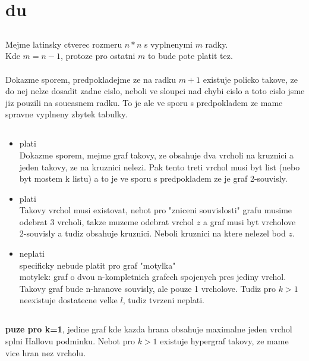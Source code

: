 \documentclass[a4paper]{article}
\begin{document}
\pagestyle{fancy}

\setcounter{section}{1}
\section{du}
\subsection{}
Mejme latinsky ctverec rozmeru $n*n$ s vyplnenymi $m$ radky.\\
Kde $m = n-1$, protoze pro ostatni $m$ to bude pote platit tez.\\
\\
Dokazme sporem, predpokladejme ze na radku $m+1$ existuje policko takove, 
ze do nej nelze dosadit zadne cislo, neboli ve sloupci nad chybi cislo a toto cislo jsme jiz pouzili na soucasnem radku. To je ale ve sporu s predpokladem ze mame spravne vyplneny zbytek tabulky.

\subsection{}
\begin{itemize}
\item plati\\
Dokazme sporem, mejme graf takovy, ze obsahuje dva vrcholi na kruznici a jeden takovy, ze na kruznici nelezi. Pak tento treti vrchol musi byt list (nebo byt mostem k listu) a to je ve sporu s predpokladem ze je graf 2-souvisly.

\item plati\\
Takovy vrchol musi existovat, nebot pro "zniceni souvislosti" grafu musime odebrat 3 vrcholi, takze muzeme odebrat vrchol $z$ a graf musi byt vrcholove 2-souvisly a tudiz obsahuje kruznici. Neboli kruznici na ktere nelezel bod $z$.

\item neplati\\
specificky nebude platit pro graf "motylka"\\
motylek: graf o dvou n-kompletnich grafech spojenych pres jediny vrchol.
Takovy graf bude n-hranove souvisly, ale pouze 1 vrcholove.
Tudiz pro $k>1$ neexistuje dostatecne velke $l$, tudiz tvrzeni neplati.
\end{itemize}

\subsection{}
\textbf{puze pro k=1}, jedine graf kde kazda hrana obsahuje maximalne jeden vrchol splni Hallovu podminku. Nebot pro $k>1$ existuje hypergraf takovy, ze mame vice hran nez vrcholu.
\end{document}
